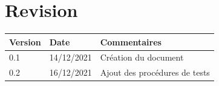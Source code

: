 \documentclass[a4paper, twoside, 12pt]{report}
\title{\titleOfDoc}
\author{\authors}
\begin{document}


\chapter*{Revision}
\begin{table}[!ht] %
	\begin{tabular}{ | m{3cm} | m{3cm}| m{8cm} | } 
		\hline
		\textbf{Version} & \textbf{Date} & \textbf{Commentaires} \\
		\hline
			0.1 & 14/12/2021 & Création du document \\
		\hline
            0.2 & 16/12/2021 & Ajout des procédures de tests \\
        \hline
	\end{tabular}
\end{table}

\tableofcontents
\newpage



%
%
\end{document}
